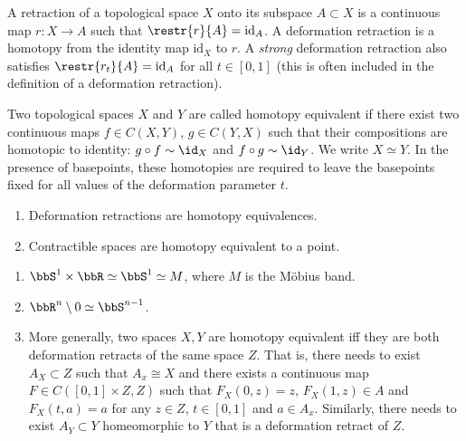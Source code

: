\begin{defn}
    A retraction of a topological space $X$ onto its subspace $A\subset X$ is a continuous map $r:X\to A$ such that $\restr{r}{A}=\mathrm{id}_A$. A deformation retraction is a homotopy from the identity map $\mathrm{id}_X$ to $r$. A \emph{strong} deformation retraction also satisfies $\restr{r_t}{A}=\mathrm{id}_A$ for all $t\in[0,1]$ (this is often included in the definition of a deformation retraction).
\end{defn}

\begin{defn}
Two topological spaces $X$ and $Y$ are called homotopy equivalent if there exist two continuous maps $f\in C(X,Y)$, $g\in C(Y,X)$ such that their compositions are homotopic to identity: $g\circ f\sim \id_X$ and $f\circ g\sim \id_Y$. We write $X\simeq Y$.
In the presence of basepoints, these homotopies are required to leave the basepoints fixed for all values of the deformation parameter $t$.
\end{defn}

\begin{cor}
    \begin{enumerate}
        \item Deformation retractions are homotopy equivalences.
        \item Contractible spaces are homotopy equivalent to a point.
    \end{enumerate}
\end{cor}

\begin{example}
\begin{enumerate}
    \item $\bbS^1\times\bbR \simeq \bbS^1\simeq M$, where $M$ is the M\"obius band.
    \item $\bbR^n\setminus{0}\simeq \bbS^{n-1}$.
    \item More generally, two spaces $X,Y$ are homotopy equivalent iff they are both deformation retracts of the same space $Z$. That is, there needs to exist $A_X\subset Z$ such that $A_x\cong X$ and there exists a continuous map $F\in C([0,1]\times Z,Z)$ such that $F_X(0,z)=z$, $F_X(1,z)\in A$ and $F_X(t,a)=a$ for any $z\in Z$, $t\in [0,1]$ and $a\in A_x$. Similarly, there needs to exist $A_Y\subset Y$ homeomorphic to $Y$ that is a deformation retract of $Z$.
\end{enumerate}
\end{example}

